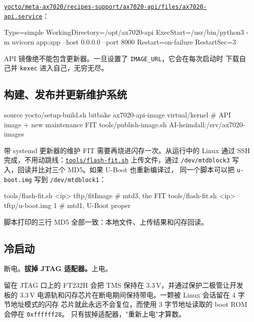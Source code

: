 \documentclass[11pt,a4paper,oneside]{article}
\newcommand{\file}[1]{{\color{bluemid}\nolinkurl{#1}}}
\newcommand{\cmd}[1]{\texttt{#1}}
\newcommand{\repo}{https://github.com/MaxClerkwell/ax7020-bringup}
\newcommand{\rfile}[1]{\href{\repo/blob/master/#1}{\color{bluemid}\nolinkurl{#1}}}
\begin{document}
\rfile{yocto/meta-ax7020/recipes-support/ax7020-api/files/ax7020-api.service}：

\begin{code}
[Service]
Type=simple
WorkingDirectory=/opt/ax7020-api
ExecStart=/usr/bin/python3 -m uvicorn app:app --host 0.0.0.0 --port 8000
Restart=on-failure
RestartSec=3
\end{code}

\begin{mustknow}
API 镜像绝不能包含更新器。一旦设置了 \cmd{IMAGE\_URL}，它会在每次启动时
下载自己并 \cmd{kexec} 进入自己，无穷无尽。
\end{mustknow}

\subsection{构建、发布并更新维护系统}

\begin{shell}
source yocto/setup-build.sh
bitbake ax7020-api-image virtual/kernel        # API image + new maintenance FIT
tools/publish-image.sh AI-heimdall:/srv/ax7020-images
\end{shell}

带 systemd 更新器的维护 FIT 需要再烧进闪存一次。从运行中的 Linux 通过 SSH
完成，不用动跳线：\rfile{tools/flash-fit.sh} 上传文件，通过
\file{/dev/mtdblock3} 写入，回读并比对三个 MD5。如果 U-Boot 也重新编译过，
同一个脚本可以把 \file{u-boot.img} 写到 \file{/dev/mtdblock1}：

\begin{shell}
tools/flash-fit.sh <ip> tftp/fitImage          # mtd3, the FIT
tools/flash-fit.sh <ip> tftp/u-boot.img 1      # mtd1, U-Boot proper
\end{shell}

\begin{checkpoint}
脚本打印的三行 MD5 全部一致：本地文件、上传结果和闪存回读。
\end{checkpoint}

\subsection{冷启动}

断电。\textbf{拔掉 JTAG 适配器。}上电。

\begin{mustknow}
留在 JTAG 口上的 FT232H 会把 TMS 保持在 3.3\,V，并通过保护二极管让开发板的 3.3\,V
电源轨和闪存芯片在断电期间保持带电。一颗被 Linux 会话留在 4 字节地址模式的闪存
芯片就此永远不会复位，而使用 3 字节地址读取的 boot ROM 会停在 \cmd{0xffffff28}。
只有拔掉适配器，"重新上电"才算数。
\end{mustknow}
\end{document}
